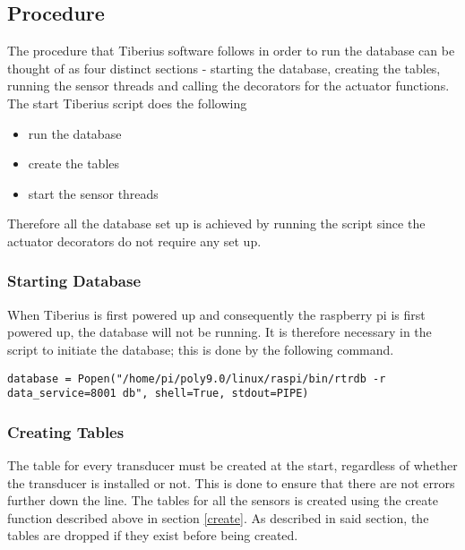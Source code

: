 \subsection{Procedure}
\label{database_process}
The procedure that Tiberius software follows in order to run the database can be thought of as four distinct sections - starting the database, creating the tables, running the sensor threads and calling the decorators for the actuator functions. 
\newline
The start Tiberius script does the following
\begin{itemize}
\item run the database
\item create the tables
\item start the sensor threads
\end{itemize} 
Therefore all the database set up is achieved by running the script since the actuator decorators do not require any set up.

\subsubsection{Starting Database}
When Tiberius is first powered up and consequently the raspberry pi is first powered  up, the database will not be running. 
It is therefore necessary in the script to initiate the database; this is done by the following command.

\begin{lstlisting}[style=custompython]
database = Popen("/home/pi/poly9.0/linux/raspi/bin/rtrdb -r data_service=8001 db", shell=True, stdout=PIPE)
\end{lstlisting}

\subsubsection{Creating Tables}
The table for every transducer must be created at the start, regardless of whether the transducer is installed or not. This is done to ensure that there are not errors further down the line.
The tables for all the sensors is created using the create function described above in section \ref{create}. As described in said section, the tables are dropped if they exist before being created.
